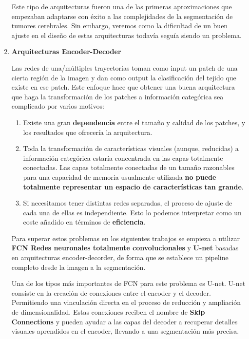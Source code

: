 \begin{enumerate}
				Este tipo de arquitecturas fueron una de las primeras aproximaciones que empezaban adaptarse con éxito a las complejidades de la segmentación de tumores cerebrales. Sin embargo, veremos como la dificultad de un buen ajuste en el diseño de estas arquitecturas todavía seguía siendo un problema.
					
				\item \textbf{Arquitecturas Encoder-Decoder}
				
				Las redes de una/múltiples trayectorias toman como input un patch de una cierta región de la imagen y dan como output la clasificación del tejido que existe en ese patch. Este enfoque hace que obtener una buena arquitectura que haga la transformación de los patches a información categórica sea complicado por varios motivos: 
				\begin{enumerate}
					\item Existe una gran \textbf{dependencia} entre el tamaño y calidad de los patches, y los resultados que ofrecería la arquitectura.
					
					\item Toda la transformación de características visuales (aunque, reducidas) a información categórica estaría concentrada en las capas totalmente conectadas. Las capas totalmente conectadas de un tamaño razonables para una capacidad de memoria usualmente utilizada \textbf{no puede totalmente representar un espacio de características tan grande}.
					
					\item Si necesitamos tener distintas redes separadas, el proceso de ajuste de cada una de ellas es independiente. Esto lo podemos interpretar como un coste añadido en términos de \textbf{eficiencia}.
					
				\end{enumerate}
				
				Para superar estos problemas en los siguientes trabajos se empieza a utilizar \textbf{FCN Redes neuronales totalmente convolucionales} y \textbf{U-net} basadas en arquitecturas encoder-decorder, de forma que se establece un pipeline completo desde la imagen a la segmentación.
				
				Una de los tipos más importantes de FCN para este problema es U-net. U-net consiste en la creación de conexiones entre el encoder y el decoder. Permitiendo una vinculación directa en el proceso de reducción y ampliación de dimensionalidad. Estas conexiones reciben el nombre de \textbf{Skip Connections} y pueden ayudar a las capas del decoder a recuperar detalles visuales aprendidos en el encoder, llevando a una segmentación más precisa.
				

\end{enumerate}
